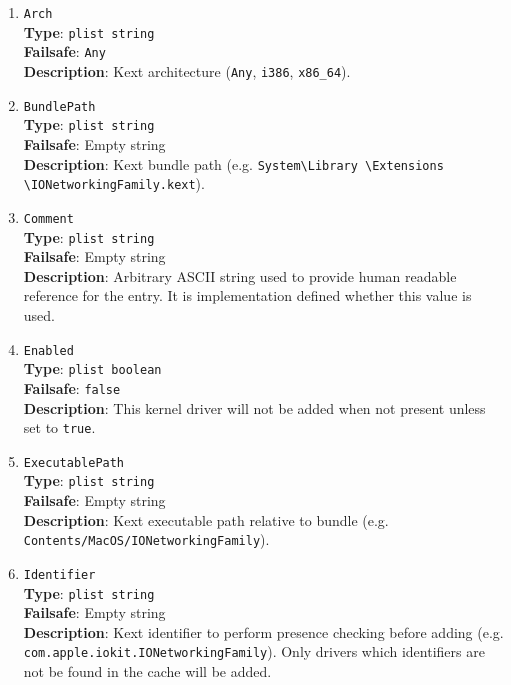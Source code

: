 \documentclass[]{article}
\begin{document}
\begin{enumerate}
\item
  \texttt{Arch}\\
  \textbf{Type}: \texttt{plist\ string}\\
  \textbf{Failsafe}: \texttt{Any}\\
  \textbf{Description}: Kext architecture (\texttt{Any}, \texttt{i386}, \texttt{x86\_64}).

\item
  \texttt{BundlePath}\\
  \textbf{Type}: \texttt{plist\ string}\\
  \textbf{Failsafe}: Empty string\\
  \textbf{Description}: Kext bundle path (e.g.
  \texttt{System\textbackslash Library \textbackslash Extensions \textbackslash IONetworkingFamily.kext}).

\item
  \texttt{Comment}\\
  \textbf{Type}: \texttt{plist\ string}\\
  \textbf{Failsafe}: Empty string\\
  \textbf{Description}: Arbitrary ASCII string used to provide human readable
  reference for the entry. It is implementation defined whether this value is
  used.

\item
  \texttt{Enabled}\\
  \textbf{Type}: \texttt{plist\ boolean}\\
  \textbf{Failsafe}: \texttt{false}\\
  \textbf{Description}: This kernel driver will not be added when not present
  unless set to \texttt{true}.

\item
  \texttt{ExecutablePath}\\
  \textbf{Type}: \texttt{plist\ string}\\
  \textbf{Failsafe}: Empty string\\
  \textbf{Description}: Kext executable path relative to bundle
  (e.g. \texttt{Contents/MacOS/IONetworkingFamily}).

\item
  \texttt{Identifier}\\
  \textbf{Type}: \texttt{plist\ string}\\
  \textbf{Failsafe}: Empty string\\
  \textbf{Description}: Kext identifier to perform presence checking
  before adding (e.g. \texttt{com.apple.iokit.IONetworkingFamily}).
  Only drivers which identifiers are not be found in the cache will be added.


\end{enumerate}
\end{document}
